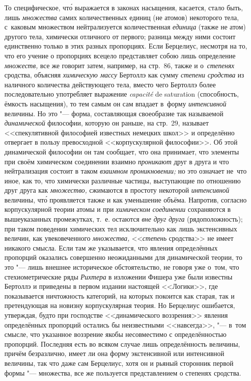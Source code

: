 То специфическое, чт\'{о} выражается в законах насыщения, касается, стало быть,
лишь {\em множества} самих количественных единиц (не атомов) некоторого тела,
с~каковым множеством нейтрализуется количественная {\em единица} (также не
атом) другого тела, химически отличного от первого; разница между ними состоит
единственно только в этих разных пропорциях. Если Берцелиус, несмотря на то,
что его учение о пропорциях всецело представляет собою лишь определение
{\em множеств,} все же говорит затем, например, на стр.~86, также и
о~{\em степенях} сродства, объясняя {\em химическую массу} Бертоллэ как сумму
{\em степени сродства} из наличного количества действующего тела, вместо чего
Бертоллэ более последовательно употребляет выражение {\em capa\-cité} de
satura\-tion (способность, ёмкость насыщения), то тем самым он сам впадает
в~форму {\em интенсивной} величины. Но это "--- форма, составляющая своеобразие
так называемой {\em динамической} философии, которую он раньше, на стр.~29,
называет <<спекулятивной философией известных немецких школ>> и определённо
отвергает в пользу превосходной <<корпускулярной философии>>. Об этой
динамической философии он там сообщает, что она принимает, что элементы при
своём химическом соединении взаимно {\em проникают} друг в друга и что
нейтрализация состоит в таком {\em взаимном проникновении;} но это означает
не~что иное, как то, что химически различные частицы, выступающие по отношению
друг друга как {\em множество,} сжимаются в простоту некоторой
{\em интенсивной} величины, чт\'{о} проявляется также и как уменьшение объёма.
Напротив, согласно корпускулярной теории атомы и при
{\em химическом соединении} сохраняются в вышеуказанных промежутках, т.~е.
остаются {\em вне друг друга} (рядоположность); при таком поведении химических
тел исключительно как лишь экстенсивных величин, как увековеченного
{\em множества,} <<{\em степень} сродства>> не имеет никакого смысла. Если там
же указывается, что явления определённых пропорций оказались совершенно
неожиданными для динамической теории, то это "--- лишь внешнее историческое
обстоятельство, не говоря уже о~том, что стехиометрические ряды {\em Рихтера}
в изложении Фишера уже были известны Бертоллэ и приведены в первом издании
настоящей <<Логики>>, где показывается ничтожность категорий, на которых
покоится как старая, так и претендующая на новизну корпускулярная теория.
Но Берцелиус ошибается, утверждая, будто при господстве <<динамического
воззрения>> явления определённых пропорций остались бы неизвестными
<<навсегда>>, "--- в~том смысле, что указанное воззрение якобы несовместимо с
определённостью пропорций. Последняя есть во всяком случае лишь определённость
величины, причём безразлично, имеет ли она форму экстенсивной или интенсивной
величины, так что даже сам Берцелиус, хотя он и рьяный сторонник первой формы
"--- множества, все же пользуется представлением о степенях сродства.

